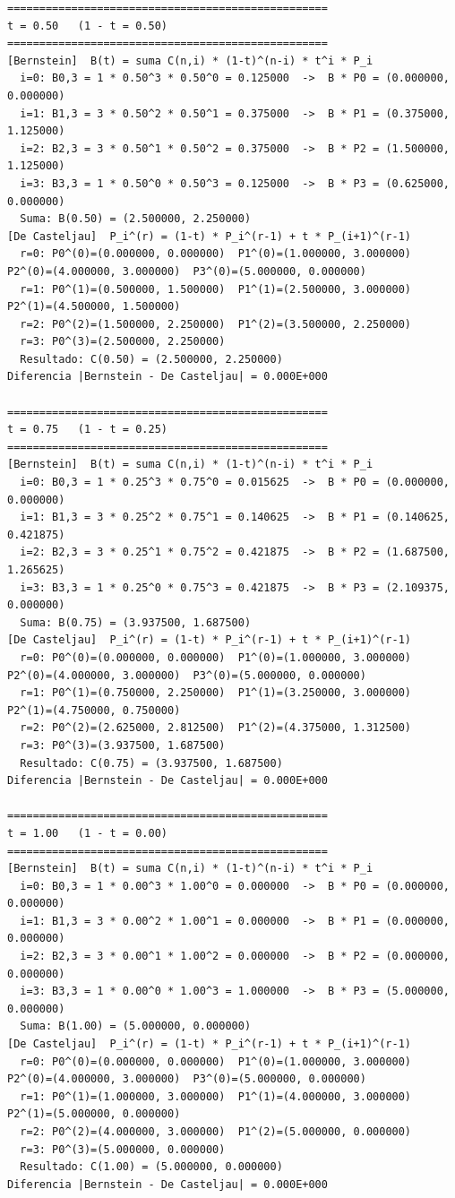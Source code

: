 \begin{lstlisting}[caption={Salida de la validacion manual de la curva cubica.}, label={lst:anx_salida}, basicstyle=\ttfamily\scriptsize]
==================================================
t = 0.50   (1 - t = 0.50)
==================================================
[Bernstein]  B(t) = suma C(n,i) * (1-t)^(n-i) * t^i * P_i
  i=0: B0,3 = 1 * 0.50^3 * 0.50^0 = 0.125000  ->  B * P0 = (0.000000, 0.000000)
  i=1: B1,3 = 3 * 0.50^2 * 0.50^1 = 0.375000  ->  B * P1 = (0.375000, 1.125000)
  i=2: B2,3 = 3 * 0.50^1 * 0.50^2 = 0.375000  ->  B * P2 = (1.500000, 1.125000)
  i=3: B3,3 = 1 * 0.50^0 * 0.50^3 = 0.125000  ->  B * P3 = (0.625000, 0.000000)
  Suma: B(0.50) = (2.500000, 2.250000)
[De Casteljau]  P_i^(r) = (1-t) * P_i^(r-1) + t * P_(i+1)^(r-1)
  r=0: P0^(0)=(0.000000, 0.000000)  P1^(0)=(1.000000, 3.000000)  P2^(0)=(4.000000, 3.000000)  P3^(0)=(5.000000, 0.000000)  
  r=1: P0^(1)=(0.500000, 1.500000)  P1^(1)=(2.500000, 3.000000)  P2^(1)=(4.500000, 1.500000)  
  r=2: P0^(2)=(1.500000, 2.250000)  P1^(2)=(3.500000, 2.250000)  
  r=3: P0^(3)=(2.500000, 2.250000)  
  Resultado: C(0.50) = (2.500000, 2.250000)
Diferencia |Bernstein - De Casteljau| = 0.000E+000

==================================================
t = 0.75   (1 - t = 0.25)
==================================================
[Bernstein]  B(t) = suma C(n,i) * (1-t)^(n-i) * t^i * P_i
  i=0: B0,3 = 1 * 0.25^3 * 0.75^0 = 0.015625  ->  B * P0 = (0.000000, 0.000000)
  i=1: B1,3 = 3 * 0.25^2 * 0.75^1 = 0.140625  ->  B * P1 = (0.140625, 0.421875)
  i=2: B2,3 = 3 * 0.25^1 * 0.75^2 = 0.421875  ->  B * P2 = (1.687500, 1.265625)
  i=3: B3,3 = 1 * 0.25^0 * 0.75^3 = 0.421875  ->  B * P3 = (2.109375, 0.000000)
  Suma: B(0.75) = (3.937500, 1.687500)
[De Casteljau]  P_i^(r) = (1-t) * P_i^(r-1) + t * P_(i+1)^(r-1)
  r=0: P0^(0)=(0.000000, 0.000000)  P1^(0)=(1.000000, 3.000000)  P2^(0)=(4.000000, 3.000000)  P3^(0)=(5.000000, 0.000000)  
  r=1: P0^(1)=(0.750000, 2.250000)  P1^(1)=(3.250000, 3.000000)  P2^(1)=(4.750000, 0.750000)  
  r=2: P0^(2)=(2.625000, 2.812500)  P1^(2)=(4.375000, 1.312500)  
  r=3: P0^(3)=(3.937500, 1.687500)  
  Resultado: C(0.75) = (3.937500, 1.687500)
Diferencia |Bernstein - De Casteljau| = 0.000E+000

==================================================
t = 1.00   (1 - t = 0.00)
==================================================
[Bernstein]  B(t) = suma C(n,i) * (1-t)^(n-i) * t^i * P_i
  i=0: B0,3 = 1 * 0.00^3 * 1.00^0 = 0.000000  ->  B * P0 = (0.000000, 0.000000)
  i=1: B1,3 = 3 * 0.00^2 * 1.00^1 = 0.000000  ->  B * P1 = (0.000000, 0.000000)
  i=2: B2,3 = 3 * 0.00^1 * 1.00^2 = 0.000000  ->  B * P2 = (0.000000, 0.000000)
  i=3: B3,3 = 1 * 0.00^0 * 1.00^3 = 1.000000  ->  B * P3 = (5.000000, 0.000000)
  Suma: B(1.00) = (5.000000, 0.000000)
[De Casteljau]  P_i^(r) = (1-t) * P_i^(r-1) + t * P_(i+1)^(r-1)
  r=0: P0^(0)=(0.000000, 0.000000)  P1^(0)=(1.000000, 3.000000)  P2^(0)=(4.000000, 3.000000)  P3^(0)=(5.000000, 0.000000)  
  r=1: P0^(1)=(1.000000, 3.000000)  P1^(1)=(4.000000, 3.000000)  P2^(1)=(5.000000, 0.000000)  
  r=2: P0^(2)=(4.000000, 3.000000)  P1^(2)=(5.000000, 0.000000)  
  r=3: P0^(3)=(5.000000, 0.000000)  
  Resultado: C(1.00) = (5.000000, 0.000000)
Diferencia |Bernstein - De Casteljau| = 0.000E+000


\end{lstlisting}
